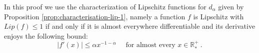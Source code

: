\documentclass[11pt,a4paper]{article}
\newcommand{\RRP}{\mathbb{R}^+_*}
\newcommand{\brac}[1]{\left\langle#1\right\rangle}
\newcommand{\dd}{\mathop{}\!\mathrm{d}}
\begin{document}

In this proof we use the characterization of Lipschitz functions for $d_\alpha$ given by Proposition \ref{prop:characterisation-lip-1}, namely a function $f$ is Lipschitz with $Lip(f) \leq 1$ if and only if it is almost everywhere differentiable and its derivative enjoys the following bound:
\[
    |f'(x)| \leq \alpha x^{-1-\alpha} \quad \text{ for almost every }x \in \RRP\ .
\]
\end{document}
